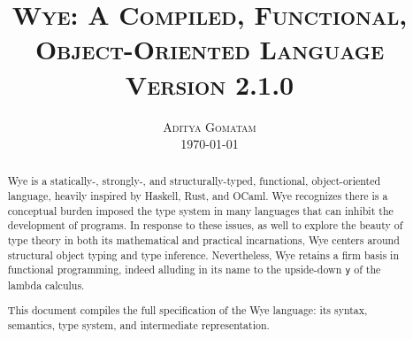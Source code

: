 \documentclass[a4paper, 12pt]{article}
\newcommand{\version}{2.1.0}
\begin{document}
\title{
\textsc{Wye: A Compiled, Functional, Object-Oriented Language} \\
\vspace{2ex}
\large{\textsc{Version \version}}\\
\vspace{2ex}
}
\author{\normalsize\textsc{Aditya Gomatam} \\ 
\normalsize{\today\vspace{2ex}}}
\date{}
\maketitle


\begin{abstract}
Wye is a statically-, strongly-, and structurally-typed, functional, object-oriented language,
heavily inspired by Haskell, Rust, and OCaml. Wye recognizes there is a conceptual burden
imposed the type system in many languages that can inhibit the development of programs.
In response to these issues, as well to explore the beauty of type theory in both its mathematical and
practical incarnations, Wye centers around structural object typing and type inference.
Nevertheless, Wye retains a firm basis in functional programming,
indeed alluding in its name to the upside-down \texttt{y} of the lambda calculus.

This document compiles the full specification of the Wye language: its syntax, semantics,
type system, and intermediate representation.
\end{abstract}




\end{document}
